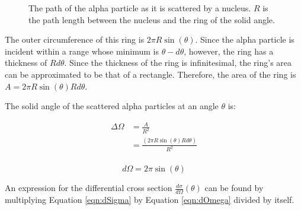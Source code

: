 \documentclass[a4paper]{article}
\begin{document}
\begin{figure}[H]
  \begin{center}
  \end{center}
  \caption{The path of the alpha particle as it is scattered by a nucleus. \( R
    \) is the path length between the nucleus and the ring of the solid
    angle.}
  \label{fig:alphaDist}
\end{figure}

\qq The outer circumference of this ring is \( 2 \pi R \sin{(\theta)} \). Since
the alpha particle is incident within a range whose minimum is \( \theta -
d\theta \), however, the ring has a thickness of \( R d\theta \). Since the
thickness of the ring is infinitesimal, the ring's area can be approximated to
be that of a rectangle. Therefore, the area of the ring is \( A = 2 \pi R
\sin{(\theta)} R d\theta \).

\qq The solid angle of the scattered alpha particles at an angle \( \theta \)
is:

\begin{align*}
  \Delta \Omega &= \frac{A}{R^2} \\
                &= \frac{(2 \pi R \sin{(\theta)} R d\theta)}{R^2} \\
\end{align*}

\begin{equation}
  d\Omega = 2 \pi \sin{(\theta)}
\end{equation}
\label{eqn:dOmega}

\qq An expression for the differential cross section \( \frac{d\sigma}{d\Omega}
(\theta) \) can be found by multiplying Equation \ref{eqn:dSigma} by Equation
\ref{eqn:dOmega} divided by itself.
\end{document}
